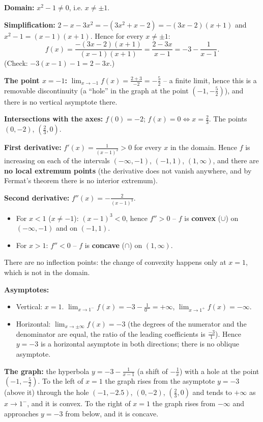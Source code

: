 \begin{solution}
\textbf{Domain:} $x^2-1\neq0$, i.e. $x\neq\pm1$.

\textbf{Simplification:} $2-x-3x^2=-(3x^2+x-2)=-(3x-2)(x+1)$ and $x^2-1=(x-1)(x+1)$. Hence for every $x\neq\pm1$:
\[ f(x)=\frac{-(3x-2)(x+1)}{(x-1)(x+1)}=\frac{2-3x}{x-1}=-3-\frac{1}{x-1}. \]
(Check: $-3(x-1)-1=2-3x$.)

\textbf{The point $x=-1$:} $\lim_{x\to-1}f(x)=\frac{2+3}{-2}=-\frac52$ -- a finite limit, hence this is a removable discontinuity (a ``hole'' in the graph at the point $(-1,-\frac52)$), and there is no vertical asymptote there.

\textbf{Intersections with the axes:} $f(0)=-2$; $f(x)=0\iff x=\frac23$. The points $(0,-2)$, $(\frac23,0)$.

\textbf{First derivative:} $f'(x)=\frac{1}{(x-1)^2}>0$ for every $x$ in the domain. Hence $f$ is increasing on each of the intervals $(-\infty,-1)$, $(-1,1)$, $(1,\infty)$, and there are \textbf{no local extremum points} (the derivative does not vanish anywhere, and by Fermat's theorem there is no interior extremum).

\textbf{Second derivative:} $f''(x)=-\frac{2}{(x-1)^3}$.
\begin{itemize}
  \item For $x<1$ ($x\neq-1$): $(x-1)^3<0$, hence $f''>0$ -- $f$ is \textbf{convex} ($\cup$) on $(-\infty,-1)$ and on $(-1,1)$.
  \item For $x>1$: $f''<0$ -- $f$ is \textbf{concave} ($\cap$) on $(1,\infty)$.
\end{itemize}
There are no inflection points: the change of convexity happens only at $x=1$, which is not in the domain.

\textbf{Asymptotes:}
\begin{itemize}
  \item Vertical: $x=1$. $\lim_{x\to1^-}f(x)=-3-\frac{1}{0^-}=+\infty$, $\lim_{x\to1^+}f(x)=-\infty$.
  \item Horizontal: $\lim_{x\to\pm\infty}f(x)=-3$ (the degrees of the numerator and the denominator are equal, the ratio of the leading coefficients is $\frac{-3}{1}$). Hence $y=-3$ is a horizontal asymptote in both directions; there is no oblique asymptote.
\end{itemize}

\textbf{The graph:} the hyperbola $y=-3-\frac1{x-1}$ (a shift of $-\frac1x$) with a hole at the point $(-1,-\frac52)$. To the left of $x=1$ the graph rises from the asymptote $y=-3$ (above it) through the hole $(-1,-2.5)$, $(0,-2)$, $(\frac23,0)$ and tends to $+\infty$ as $x\to1^-$, and it is convex. To the right of $x=1$ the graph rises from $-\infty$ and approaches $y=-3$ from below, and it is concave.
\end{solution}
